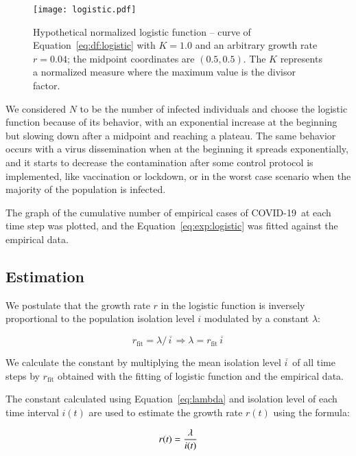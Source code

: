 \documentclass[review,3p,times]{elsarticle}
\def\covid{\hbox{COVID-19}} %
\def\eq#1{Equation~#1}
\begin{document}
\begin{figure}
\centering
\texttt{[image: logistic.pdf]}
\caption{Hypothetical normalized logistic function -- 
curve of \eq{\ref{eq:df:logistic}} with 
$K=1.0$ and an arbitrary growth rate $r=0.04$; 
the midpoint coordinates are $(0.5, 0.5)$.
The $K$ represents a normalized measure where 
the maximum value is the divisor factor.}
\label{fig:logistic}
\end{figure}

We considered $N$ to be the number of infected individuals 
and choose the logistic function because of its behavior, 
with an exponential increase at the beginning but slowing down after 
a  midpoint and reaching a plateau. 
The same behavior occurs with a virus dissemination when at the 
beginning it spreads exponentially, and it starts to 
decrease the contamination after some control protocol is implemented, 
like vaccination or lockdown, 
or in the worst case scenario when the majority of the population is infected.

The graph of the cumulative number of empirical cases of \covid\ 
at each time step was plotted, 
and the \eq{\ref{eq:exp:logistic}} was fitted against the 
empirical data.

\subsection{Estimation}

We postulate that the growth rate $r$ in the logistic function is 
inversely proportional to the population isolation level $i$ 
modulated by a constant $\lambda$:

\begin{equation}
r_{\text{fit}} = {\lambda /\, \overline{i\,}} \Rightarrow \lambda = r_{\text{fit}}\, \overline{i\,}
\label{eq:lambda}
\end{equation}

We calculate the constant by multiplying 
the mean isolation level $\overline{i\,}$  
of all time steps by 
$r_{\text{fit}}$ obtained with the fitting of 
logistic function and the empirical data.

The constant calculated using \eq{\ref{eq:lambda}}
and isolation level of each time interval $i(t)$ 
are used to estimate the growth rate $r(t)$ using the formula:

\begin{equation}
r(t) = {\lambda\over i(t)}
\label{eq:rt}
\end{equation}
\end{document}
